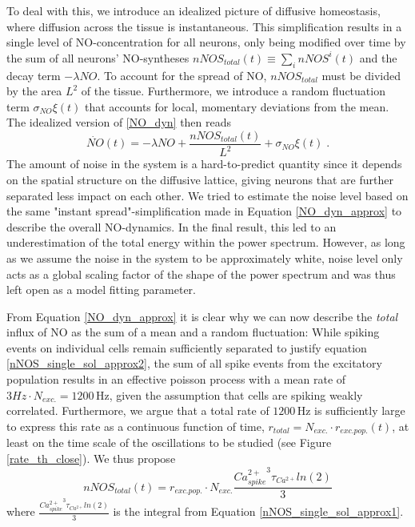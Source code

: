 \documentclass[10pt,a4paper]{article}
\begin{document}
To deal with this, we introduce an idealized picture of diffusive homeostasis, where diffusion across the tissue is instantaneous. This simplification results in a single level of NO-concentration for all neurons, only being modified over time by the sum of all neurons' NO-syntheses $nNOS_{total}(t) \equiv \sum_{i} nNOS^i(t)$ and the decay term $-\lambda NO$. To account for the spread of NO, $nNOS_{total}$ must be divided by the area $L^2$ of the tissue. Furthermore, we introduce a random fluctuation term $\sigma_{NO} \xi(t)$ that accounts for local, momentary deviations from the mean. The idealized version of \eqref{NO_dyn} then reads
\begin{equation}
\dot{NO}(t)=-\lambda NO + \frac{nNOS_{total}(t)}{L^2} + \sigma_{NO} \xi(t)\;.
\label{NO_dyn_approx}
\end{equation}
The amount of noise in the system is a hard-to-predict quantity since it depends on the spatial structure on the diffusive lattice, giving neurons that are further separated less impact on each other. We tried to estimate the noise level based on the same "instant spread"-simplification made in Equation \eqref{NO_dyn_approx} to describe the overall NO-dynamics. In the final result, this led to an underestimation of the total energy within the power spectrum. However, as long as we assume the noise in the system to be approximately white, noise level only acts as a global scaling factor of the shape of the power spectrum and was thus left open as a model fitting parameter.

From Equation \eqref{NO_dyn_approx} it is clear why we can now describe the \emph{total} influx of NO as the sum of a mean and a random fluctuation: While spiking events on individual cells remain sufficiently separated to justify equation \eqref{nNOS_single_sol_approx2}, the sum of all spike events from the excitatory population results in an effective poisson process with a mean rate of $3 Hz \cdot N_{exc.} = \mathrm{1200\,Hz}$, given the assumption that cells are spiking weakly correlated. Furthermore, we argue that a total rate of $\mathrm{1200\,Hz}$ is sufficiently large to express this rate as a continuous function of time, $r_{total} = N_{exc.}\cdot r_{exc.pop.}(t)$, at least on the time scale of the oscillations to be studied (see  Figure \ref{rate_th_close}). We thus propose
\begin{equation}
nNOS_{total}(t) = r_{exc.pop.}\cdot N_{exc.}\frac{{Ca^{2+}_{spike}}^3 \tau_{Ca^{2+}}ln(2)}{3}
\label{nNOS_total_dyn}
\end{equation} 
where $\frac{{Ca^{2+}_{spike}}^3 \tau_{Ca^{2+}}ln(2)}{3}$ is the integral from Equation \eqref{nNOS_single_sol_approx1}.
\end{document}
